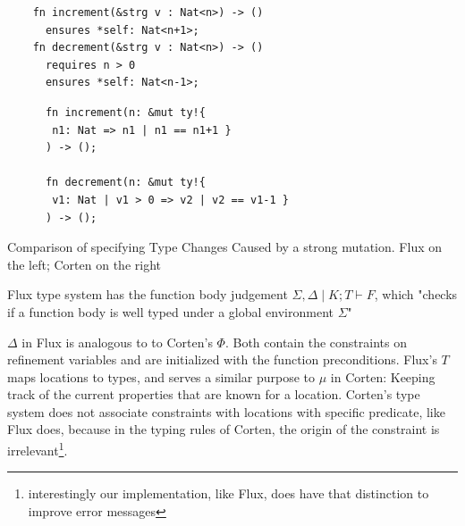 \begin{listing}[h]
  \begin{minipage}[t]{0.48\linewidth}
    
    \begin{verbatim}
    fn increment(&strg v : Nat<n>) -> ()
      ensures *self: Nat<n+1>;
    fn decrement(&strg v : Nat<n>) -> ()
      requires n > 0
      ensures *self: Nat<n-1>;
    \end{verbatim}
  \end{minipage}
  \begin{minipage}[t]{0.48\linewidth}
    \begin{verbatim}
      fn increment(n: &mut ty!{
       n1: Nat => n1 | n1 == n1+1 }
      ) -> ();

      fn decrement(n: &mut ty!{ 
       v1: Nat | v1 > 0 => v2 | v2 == v1-1 }
      ) -> ();
    \end{verbatim}
  \end{minipage}
  
  \caption{Comparison of specifying Type Changes Caused by a strong mutation. Flux on the left; Corten on the right}
  \label{lst:compare-flux-strong-updates}
\end{listing}

Flux type system has the function body judgement $\Sigma, \Delta \mid K;T \vdash F$, which "checks if a function body is well typed under a global environment $\Sigma$" \cite[p. 11]{lehmann_flux_2022}

$\Delta$ in Flux is analogous to to Corten's $\Phi$. Both contain the constraints on refinement variables and are initialized with the function preconditions. 
Flux's $T$ maps locations to types, and serves a similar purpose to $\mu$ in Corten: Keeping track of the current properties that are known for a location. Corten's type system does not associate constraints with locations with specific predicate, like Flux does, because in the typing rules of Corten, the origin of the constraint is irrelevant\footnote{interestingly our implementation, like Flux, does have that distinction to improve error messages}.


